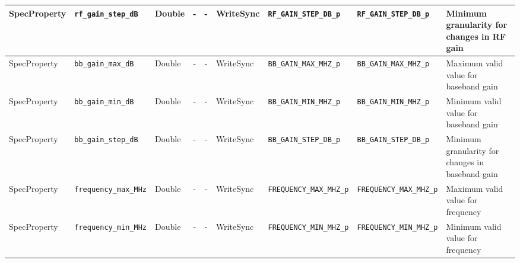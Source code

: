\documentclass{article}
\begin{document}
\begin{landscape}
\begin{scriptsize}
\begin{longtable}{|p{1.8cm}|p{4.1cm}|p{1cm}|c|c|p{1.6cm}|p{3.7cm}|p{3.7cm}|p{2.5cm}|}
			\hline
			SpecProperty & \verb+rf_gain_step_dB+              & Double& -        & -          & WriteSync      & \verb+RF_GAIN_STEP_DB_p+ & \verb+RF_GAIN_STEP_DB_p+ & Minimum granularity for changes in RF gain                                                                                                                                                                                  \\
			\hline
			SpecProperty & \verb+bb_gain_max_dB+               & Double& -        & -          & WriteSync      & \verb+BB_GAIN_MAX_MHZ_p+ & \verb+BB_GAIN_MAX_MHZ_p+ & Maximum valid value for baseband gain                                                                                                                                                                                       \\
			\hline
			SpecProperty & \verb+bb_gain_min_dB+               & Double& -        & -          & WriteSync      & \verb+BB_GAIN_MIN_MHZ_p+ & \verb+BB_GAIN_MIN_MHZ_p+ & Minimum valid value for baseband gain                                                                                                                                                                                       \\
			\hline
			SpecProperty & \verb+bb_gain_step_dB+              & Double& -        & -          & WriteSync      & \verb+BB_GAIN_STEP_DB_p+ & \verb+BB_GAIN_STEP_DB_p+ & Minimum granularity for changes in baseband gain                                                                                                                                                                            \\
			\hline
			SpecProperty & \verb+frequency_max_MHz+            & Double& -        & -          & WriteSync      & \verb+FREQUENCY_MAX_MHZ_p+ & \verb+FREQUENCY_MAX_MHZ_p+ & Maximum valid value for frequency                                                                                                                                                                                           \\
			\hline
			SpecProperty & \verb+frequency_min_MHz+            & Double& -        & -          & WriteSync      & \verb+FREQUENCY_MIN_MHZ_p+ & \verb+FREQUENCY_MIN_MHZ_p+ & Minimum valid value for frequency                                                                                                                                                                                           \\

\end{longtable}
\end{scriptsize}
\end{landscape}
\end{document}
